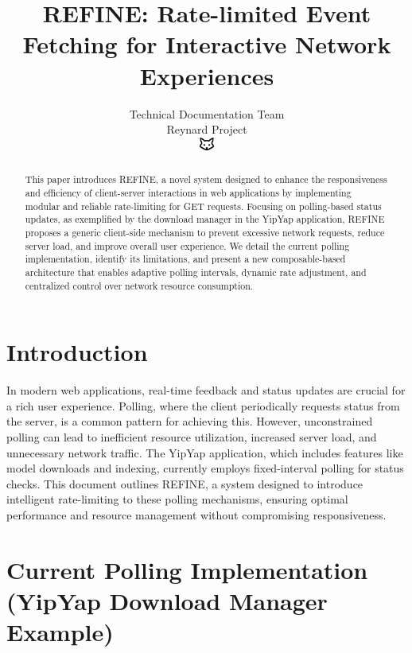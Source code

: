 \documentclass[10pt]{article}
\begin{document}
\title{REFINE: Rate-limited Event Fetching for Interactive Network Experiences}

\author{Technical Documentation Team\\
Reynard Project\\
\includegraphics[width=0.5cm]{favicon.pdf}}

\maketitle

\begin{abstract}
This paper introduces REFINE, a novel system designed to enhance the responsiveness and efficiency of client-server interactions in web applications by implementing modular and reliable rate-limiting for GET requests. Focusing on polling-based status updates, as exemplified by the download manager in the YipYap application, REFINE proposes a generic client-side mechanism to prevent excessive network requests, reduce server load, and improve overall user experience. We detail the current polling implementation, identify its limitations, and present a new composable-based architecture that enables adaptive polling intervals, dynamic rate adjustment, and centralized control over network resource consumption.
\end{abstract}

\section{Introduction}

In modern web applications, real-time feedback and status updates are crucial for a rich user experience. Polling, where the client periodically requests status from the server, is a common pattern for achieving this. However, unconstrained polling can lead to inefficient resource utilization, increased server load, and unnecessary network traffic. The YipYap application, which includes features like model downloads and indexing, currently employs fixed-interval polling for status checks. This document outlines REFINE, a system designed to introduce intelligent rate-limiting to these polling mechanisms, ensuring optimal performance and resource management without compromising responsiveness.

\section{Current Polling Implementation (YipYap Download Manager Example)}
\end{document}
